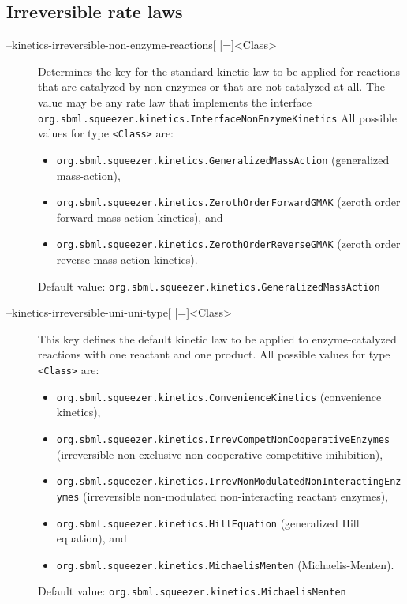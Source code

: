 \subsection{Irreversible rate laws}
\begin{description}
\item[--kinetics-irreversible-non-enzyme-reactions{[} |={]}<Class>]
  Determines the key for the standard kinetic law to be applied
  for reactions that are catalyzed by non-enzymes or that are
  not catalyzed at all. The value may be any rate law that implements the
  interface
  \texttt{org.sbml.squeezer.kinetics.InterfaceNonEnzymeKinetics}
  All possible values for type \texttt{<Class>} are:
  \begin{itemize}
  \item\texttt{org.sbml.squeezer.kinetics.GeneralizedMassAction} (generalized mass-action),
  \item\texttt{org.sbml.squeezer.kinetics.ZerothOrderForwardGMAK} (zeroth order forward mass action kinetics), and
  \item\texttt{org.sbml.squeezer.kinetics.ZerothOrderReverseGMAK} (zeroth order reverse mass action kinetics).
  \end{itemize}
  Default value: \texttt{org.sbml.squeezer.kinetics.GeneralizedMassAction}

\item[--kinetics-irreversible-uni-uni-type{[} |={]}<Class>]
  This key defines the default kinetic law to be applied to enzyme-catalyzed
  reactions with one reactant and one product.
  All possible values for type \texttt{<Class>} are:
  \begin{itemize}
  \item\texttt{org.sbml.squeezer.kinetics.ConvenienceKinetics} (convenience kinetics),
  \item\texttt{org.sbml.squeezer.kinetics.IrrevCompetNonCooperativeEnzymes} (irreversible non-exclusive non-cooperative competitive inihibition),
  \item\texttt{org.sbml.squeezer.kinetics.IrrevNonModulatedNonInteractingEnzymes} (irreversible non-modulated non-interacting reactant enzymes),
  \item\texttt{org.sbml.squeezer.kinetics.HillEquation} (generalized Hill equation), and
  \item\texttt{org.sbml.squeezer.kinetics.MichaelisMenten} (Michaelis-Menten).
  \end{itemize}
  Default value: \texttt{org.sbml.squeezer.kinetics.MichaelisMenten}


\end{description}
